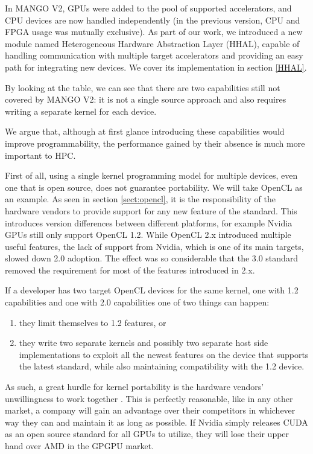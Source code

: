 In MANGO V2, GPUs were added to the pool of supported accelerators, and CPU devices are now handled independently (in the previous version, CPU and FPGA usage was mutually exclusive).
As part of our work, we introduced a new module named Heterogeneous Hardware Abstraction Layer (HHAL), capable of handling communication with multiple target accelerators and providing an easy path for integrating new devices. We cover its implementation in section \ref{HHAL}.

By looking at the table, we can see that there are two capabilities still not covered by MANGO V2: it is not a single source approach and also requires writing a separate kernel for each device.

We argue that, although at first glance introducing these capabilities would improve programmability, the performance gained by their absence is much more important to HPC.

First of all, using a single kernel programming model for multiple devices, even one that is open source, does not guarantee portability. We will take OpenCL as an example. As seen in section \ref{sect:opencl}, it is the responsibility of the hardware vendors to provide support for any new feature of the standard. This introduces version differences between different platforms, for example Nvidia GPUs still only support OpenCL 1.2. While OpenCL 2.x introduced multiple useful features, the lack of support from Nvidia, which is one of its main targets, slowed down 2.0 adoption. The effect was so considerable that the 3.0 standard removed the requirement for most of the features introduced in 2.x. 

If a developer has two target OpenCL devices for the same kernel, one with 1.2 capabilities and one with 2.0 capabilities one of two things can happen: 
\begin{enumerate}
    \item they limit themselves to 1.2 features, or
    \item they write two separate kernels and possibly two separate host side implementations to exploit all the newest features on the device that supports the latest standard, while also maintaining compatibility with the 1.2 device.
\end{enumerate}
 
As such, a great hurdle for kernel portability is the hardware vendors' unwillingness to work together \cite{but_mummy_cuda}. This is perfectly reasonable, like in any other market, a company will gain an advantage over their competitors in whichever way they can and maintain it as long as possible. If Nvidia simply releases CUDA as an open source standard for all GPUs to utilize, they will lose their upper hand over AMD in the GPGPU market.

